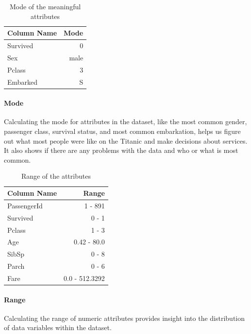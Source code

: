 \documentclass[a4paper, 12pt]{article}
\begin{document}
\begin{table}[h]
  \centering
  \begin{tabular}{lr}
    \hline
    \textbf{Column Name} & \textbf{Mode} \\
    \hline
    Survived & 0 \\
    Sex & male \\
    Pclass & 3 \\
    Embarked & S \\
    \hline
  \end{tabular}
  \caption{Mode of the meaningful attributes} 
  \paragraph*{Mode}
  \justifying
Calculating the mode for attributes in the dataset, like the most common gender, passenger class, survival status, and most common embarkation, helps us figure out what most people were like on the Titanic and make decisions about services. It also shows if there are any problems with the data and who or what is most common.
\end{table} 

\begin{table}[h]
  \centering
  \begin{tabular}{lr}
    \hline
    \textbf{Column Name} & \textbf{Range} \\
    \hline
    PassengerId & 1 - 891 \\
    Survived & 0 - 1 \\
    Pclass & 1 - 3 \\
    Age & 0.42 - 80.0 \\
    SibSp & 0 - 8 \\
    Parch & 0 - 6 \\
    Fare & 0.0 - 512.3292 \\
    \hline
  \end{tabular}
  \caption{Range of the attributes} 
  \paragraph*{Range}
  \justifying
Calculating the range of numeric attributes provides insight into the distribution of data variables within the dataset.
\end{table} 
\end{document}
